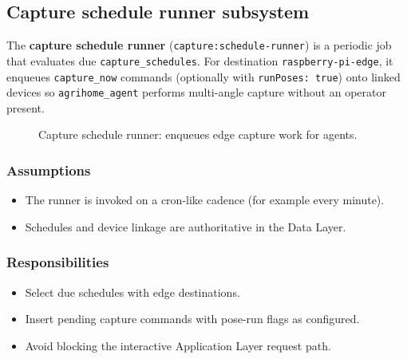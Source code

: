 \subsection{Capture schedule runner subsystem}

The \textbf{capture schedule runner} (\texttt{capture:schedule-runner}) is a periodic job that evaluates due \texttt{capture\_schedules}. For destination \texttt{raspberry-pi-edge}, it enqueues \texttt{capture\_now} commands (optionally with \texttt{runPoses: true}) onto linked devices so \texttt{agrihome\_agent} performs multi-angle capture without an operator present.

\begin{figure}[H]
\centering
{}
\caption{Capture schedule runner: enqueues edge capture work for agents.}
\label{fig:proc-sched-runner}
\end{figure}

\subsubsection{Assumptions}
\begin{itemize}
  \item The runner is invoked on a cron-like cadence (for example every minute).
  \item Schedules and device linkage are authoritative in the Data Layer.
\end{itemize}

\subsubsection{Responsibilities}
\begin{itemize}
  \item Select due schedules with edge destinations.
  \item Insert pending capture commands with pose-run flags as configured.
  \item Avoid blocking the interactive Application Layer request path.
\end{itemize}

